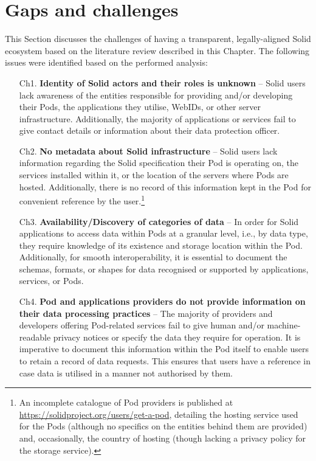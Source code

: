 \section{Gaps and challenges}
\label{sec:challenges}

This Section discusses the challenges of having a transparent, legally-aligned Solid ecosystem based on the literature review described in this Chapter. The following issues were identified based on the performed analysis:

\begin{enumerate}
    \item [Ch1.] \textbf{Identity of Solid actors and their roles is unknown} -- Solid users lack awareness of the entities responsible for providing and/or developing their Pods, the applications they utilise, WebIDs, or other server infrastructure. Additionally, the majority of applications or services fail to give contact details or information about their data protection officer.
    \item [Ch2.] \textbf{No metadata about Solid infrastructure} -- Solid users lack information regarding the Solid specification their Pod is operating on, the services installed within it, or the location of the servers where Pods are hosted. Additionally, there is no record of this information kept in the Pod for convenient reference by the user.\footnote{An incomplete catalogue of Pod providers is published at \url{https://solidproject.org/users/get-a-pod}, detailing the hosting service used for the Pods (although no specifics on the entities behind them are provided) and, occasionally, the country of hosting (though lacking a privacy policy for the storage service).}
    \item [Ch3.] \textbf{Availability/Discovery of categories of data} -- In order for Solid applications to access data within Pods at a granular level, i.e., by data type, they require knowledge of its existence and storage location within the Pod. Additionally, for smooth interoperability, it is essential to document the schemas, formats, or shapes for data recognised or supported by applications, services, or Pods.
    \item [Ch4.] \textbf{Pod and applications providers do not provide information on their data processing practices} -- The majority of providers and developers offering Pod-related services fail to give human and/or machine-readable privacy notices or specify the data they require for operation. It is imperative to document this information within the Pod itself to enable users to retain a record of data requests. This ensures that users have a reference in case data is utilised in a manner not authorised by them.

\end{enumerate}
